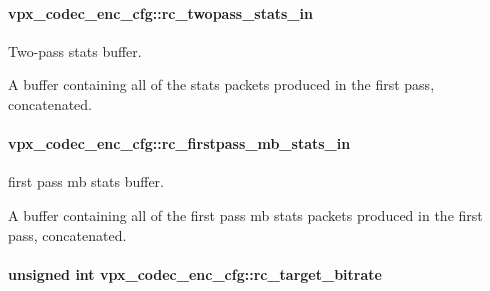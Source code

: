 \paragraph[{\texorpdfstring{rc\+\_\+twopass\+\_\+stats\+\_\+in}{rc_twopass_stats_in}}]{ vpx\+\_\+codec\+\_\+enc\+\_\+cfg\+::rc\+\_\+twopass\+\_\+stats\+\_\+in}\hypertarget{structvpx__codec__enc__cfg_a1bd769247042e5806295f6e06d20f008}{}\label{structvpx__codec__enc__cfg_a1bd769247042e5806295f6e06d20f008}


Two-\/pass stats buffer. 

A buffer containing all of the stats packets produced in the first pass, concatenated. 
\paragraph[{\texorpdfstring{rc\+\_\+firstpass\+\_\+mb\+\_\+stats\+\_\+in}{rc_firstpass_mb_stats_in}}]{ vpx\+\_\+codec\+\_\+enc\+\_\+cfg\+::rc\+\_\+firstpass\+\_\+mb\+\_\+stats\+\_\+in}\hypertarget{structvpx__codec__enc__cfg_a52dbc21bc28d6a2c7c70a43ad18461d8}{}\label{structvpx__codec__enc__cfg_a52dbc21bc28d6a2c7c70a43ad18461d8}


first pass mb stats buffer. 

A buffer containing all of the first pass mb stats packets produced in the first pass, concatenated. 
\paragraph[{\texorpdfstring{rc\+\_\+target\+\_\+bitrate}{rc_target_bitrate}}]{\setlength{\rightskip}{0pt plus 5cm}unsigned int vpx\+\_\+codec\+\_\+enc\+\_\+cfg\+::rc\+\_\+target\+\_\+bitrate}\hypertarget{structvpx__codec__enc__cfg_ab8339685175d66710f482706cc9f0aed}{}\label{structvpx__codec__enc__cfg_ab8339685175d66710f482706cc9f0aed}


